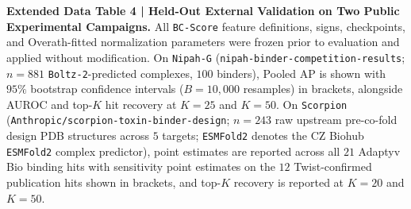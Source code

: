 \documentclass[11pt]{article}
\begin{document}
\textbf{Extended Data Table 4 | Held-Out External Validation on Two Public Experimental Campaigns.}
All \texttt{BC-Score} feature definitions, signs, checkpoints, and Overath-fitted normalization parameters were frozen prior to evaluation and applied without modification. On \texttt{Nipah-G} (\texttt{nipah-binder-competition-results}; $n = 881$ \texttt{Boltz-2}-predicted complexes, $100$ binders), Pooled AP is shown with $95\%$ bootstrap confidence intervals ($B = 10,000$ resamples) in brackets, alongside AUROC and top-$K$ hit recovery at $K=25$ and $K=50$. On \texttt{Scorpion} (\texttt{Anthropic/scorpion-toxin-binder-design}; $n = 243$ raw upstream pre-co-fold design PDB structures across $5$ targets; \texttt{ESMFold2} denotes the CZ Biohub \texttt{ESMFold2} complex predictor), point estimates are reported across all $21$ Adaptyv Bio binding hits with sensitivity point estimates on the $12$ Twist-confirmed publication hits shown in brackets, and top-$K$ recovery is reported at $K=20$ and $K=50$.
\end{document}
